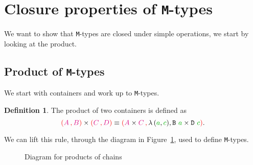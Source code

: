 \documentclass[twoside,11pt,openright]{report}
\theoremstyle{plain} %
\theoremstyle{definition}
\newtheorem{defn}{Definition}[section]
\theoremstyle{remark}
\newcommand*{\figref}[1]{Figure~\ref{fig:#1}}
\newcommand*{\term}[1]{\textcolor{green!70!black}{#1}} %
\newcommand*{\type}[1]{\textcolor{magenta!90!black}{#1}}
\newcommand*{\containerpair}[2]{\textcolor{red}{(}#1\,\textcolor{red}{,}\,#2\textcolor{red}{)}}
\newcommand*{\unit}{\type{\textbf{1}}}
\newcommand*{\function}[1]{\textcolor{blue!60!black}{\ensuremath{\mathtt{#1}}}}
\newcommand*{\typeformer}[1]{\ensuremath{\mathtt{#1}}}
\newcommand*{\functor}[1]{\ensuremath{\mathbf{\mathtt{#1}}}}
\begin{document}
\section{Closure properties of \texttt{M}-types}
We want to show that \texttt{M}-types are closed under simple operations, we start by looking at the product.
\subsection{Product of \texttt{M}-types}
We start with containers and work up to \texttt{M}-types.
\begin{defn}
  The product of two containers is defined as
  \begin{equation}
    \containerpair{\type{A}}{\type{B}} \times \containerpair{\type{C}}{\type{D}} \equiv \containerpair{\type{A} \times \type{C}}{\lambda\,(\term{a} , \term{c}), \typeformer{B}~\term{a} \times \typeformer{D}~\term{c}}.
  \end{equation}
\end{defn}
\noindent We can lift this rule, through the diagram in \figref{container-products}, used to define \texttt{M}-types.
\begin{figure}[h]
  \centering
  \caption{Diagram for products of chains}
  \label{fig:container-products}
\end{figure}
\end{document}
